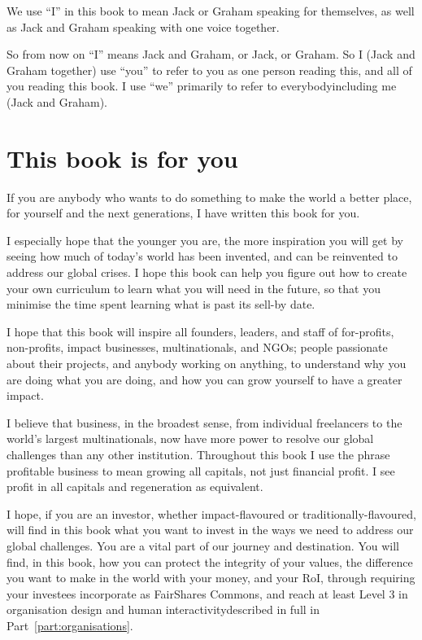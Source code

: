 We use “I” in this book to mean Jack or Graham speaking for themselves, as well as Jack and Graham speaking with one voice together. 


So from now on “I” means Jack and Graham, or Jack, or Graham. So I (Jack and Graham together) use “you” to refer to you as one person reading this, and all of you reading this book. I use “we” primarily to refer to everybody\textemdash including me (Jack and Graham).




\section*{This book is for you}
If you are anybody who wants to do something to make the world a better place, for yourself and the next generations, I have written this book for you. 


I especially hope that the younger you are, the more inspiration you will get by seeing how much of today’s world has been invented, and can be reinvented to address our global crises. I hope this book can help you figure out how to create your own curriculum to learn what you will need in the future, so that you minimise the time spent learning what is past its sell-by date.


I hope that this book will inspire all founders, leaders, and staff of for-profits, non-profits, impact businesses, multinationals, and NGOs; people passionate about their projects, and anybody working on anything, to understand why you are doing what you are doing, and how you can grow yourself to have a greater impact.


I believe that business, in the broadest sense, from individual freelancers to the world's largest multinationals, now have more power to resolve our global challenges than any other institution. Throughout this book I use the phrase profitable business to mean growing all capitals, not just financial profit. I see profit in all capitals and regeneration as equivalent.


I hope, if you are an investor, whether impact\hyp{}flavoured or traditionally\hyp{}flavoured, will find in this book what you want to invest in the ways we need to address our global challenges. You are a vital part of our journey and destination. You will find, in this book, how you can protect the integrity of your values, the difference you want to make in the world with your money, and your RoI, through requiring your investees incorporate as FairShares Commons, and reach at least Level 3 in organisation design and human interactivity\textemdash described in full in Part~\ref{part:organisations}.


